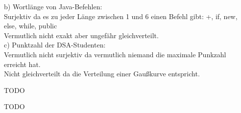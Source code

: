 \documentclass[12pt]{scrartcl}
\begin{document}
b) Wortlänge von Java-Befehlen:\\
Surjektiv da es zu jeder Länge zwischen 1 und 6 einen Befehl gibt:
+, if, new, else, while, public\\
Vermutlich nicht exakt aber ungefähr gleichverteilt.\\

c) Punktzahl der DSA-Studenten:\\
Vermutlich nicht surjektiv da vermutlich niemand die maximale Punkzahl erreicht hat.\\
Nicht gleichverteilt da die Verteilung einer Gaußkurve entspricht.

\exercise{}
TODO

\exercise{}
TODO



\end{document}
